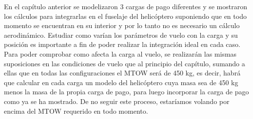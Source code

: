 En el capítulo anterior se modelizaron 3 cargas de pago diferentes y se mostraron los cálculos para integrarlas en el fuselaje del helicóptero suponiendo que en todo momento se encuentran en su interior y por lo tanto no es necesario un cálculo aerodinámico. Estudiar como varían los parámetros de vuelo con la carga y su posición es importante a fin de poder realizar la integración ideal en cada caso.
Para poder comprobar como afecta la carga al vuelo, se realizarán las mismas suposiciones en las condiciones de vuelo que al principio del capítulo, sumando a ellas que en todas las configuraciones el MTOW será de 450 kg, es decir, habrá que calcular en cada carga un modelo del helicóptero cuya masa sea de 450 kg menos la masa de la propia carga de pago, para luego incorporar la carga de pago como ya se ha mostrado. De no seguir este proceso, estaríamos volando por encima del MTOW requerido en todo momento.

